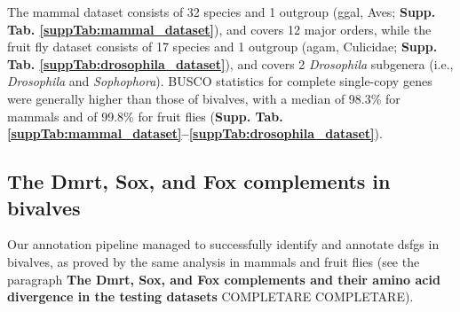 \documentclass[../main.tex]{subfiles}
\begin{document}
The mammal dataset consists of 32 species and 1 outgroup (\gls{ggal}, Aves; \textbf{Supp. Tab. \ref{suppTab:mammal_dataset}}), and covers 12 major orders, while the fruit fly dataset consists of 17 species and 1 outgroup (\gls{agam}, Culicidae; \textbf{Supp. Tab. \ref{suppTab:drosophila_dataset}}), and covers 2 \textit{Drosophila} subgenera (i.e., \textit{Drosophila} and \textit{Sophophora}). BUSCO statistics for complete single-copy genes were generally higher than those of bivalves, with a median of 98.3\% for mammals and of 99.8\% for fruit flies (\textbf{Supp. Tab. \ref{suppTab:mammal_dataset}--\ref{suppTab:drosophila_dataset}}).

\subsection{The Dmrt, Sox, and Fox complements in bivalves}
Our annotation pipeline managed to successfully identify and annotate \glspl{dsfg} in bivalves, as proved by the same analysis in mammals and fruit flies (see the paragraph \textbf{The Dmrt, Sox, and Fox complements and their amino acid divergence in the testing datasets} COMPLETARE COMPLETARE).
\end{document}
